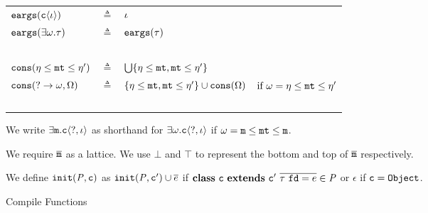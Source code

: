 \begin{figure*}[ht]
\begin{tabularx}{1\linewidth}{>{$}l<{$} >{$}c<{$} >{$}l<{$} >{$}l<{$}}
\Feargs(\classiota) & \triangleq & \listi \\
\Feargs(\texist{\econs}.\t) & \triangleq & \Feargs(\t) \\\\

\Fcons(\basemode\msub\mtvar\msub\basemode') & \triangleq & \bigcup \{\basemode\msub\mtvar,\mtvar\msub\basemode'\} \\
\Fcons(\dynmode\rightarrow\econs,\espec) & \triangleq & \{\basemode\msub\mtvar,\mtvar\msub\basemode'\} \cup \Fcons(\espec) & \textrm{if}\ \econs = \basemode\msub\mtvar\msub\basemode' \\\\

\end{tabularx}

We write $\exists\mathtt{m}.\mathtt{c}\langle\mathtt{?},\iota\rangle$ as shorthand for $\exists\omega.\mathtt{c}\langle\mathtt{?},\iota\rangle$ if $\omega = \mathtt{m}\leq\mathtt{mt}\leq\mathtt{m}$.

We require $\overline{\mathtt{m}}$ as a lattice. We use $\bot$ and $\top$ to represent the bottom and top of $\overline{\mathtt{m}}$ respectively.

We define $\mathtt{init}(\mathit{P},\mathtt{c})$ as $\mathtt{init}(\mathit{P},\mathtt{c}') \cup \overline{e}$ if $\kwclass \ \Cname \ \kwextends \ \Cname' \ \overline{\t \ \Fname = e} \in \programcode$ or $\epsilon$ if $\mathtt{c} = \texttt{Object}$.

\nocaptionrule\caption{Compile Functions}
\label{fig:compilefuncs}
\end{figure*}

